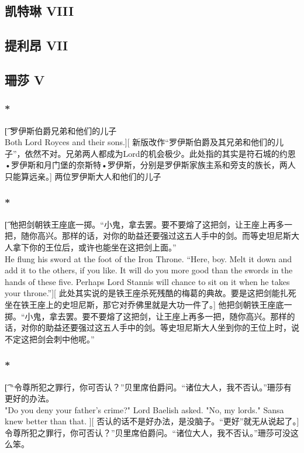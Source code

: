 \documentclass[12pt,a4paper]{article}
\begin{document}
	
\subsection{凯特琳 VIII}

\subsection{提利昂 VII}

\subsection{珊莎 V}
\subsubsection{\color{red}*}\t[	
	罗伊斯伯爵兄弟和他们的儿子\\
	Both Lord Royces and their sons.][
	新版改作“罗伊斯伯爵及其兄弟和他们的儿子”，依然不对。兄弟两人都成为Lord的机会极少。此处指的其实是符石城的约恩•罗伊斯和月门堡的奈斯特•罗伊斯，分别是罗伊斯家族主系和旁支的族长，两人只能算远亲。]
	两位罗伊斯大人和他们的儿子
	
\subsubsection{\color{red}*}\t[	
	他把剑朝铁王座底一掷。“小鬼，拿去罢。要不要熔了这把剑，让王座上再多一把，随你高兴。那样的话，对你的助益还要强过这五人手中的剑。而等史坦尼斯大人拿下你的王位后，或许也能坐在这把剑上面。”\\
	He flung his sword at the foot of the Iron Throne. “Here, boy. Melt it down and add it to the others, if you like. It will do you more good than the swords in the hands of these five. Perhaps Lord Stannis will chance to sit on it when he takes your throne.”][
	此处其实说的是铁王座杀死残酷的梅葛的典故。要是这把剑能扎死坐在铁王座上的史坦尼斯，那它对乔佛里就是大功一件了。]
	他把剑朝铁王座底一掷。“小鬼，拿去罢。要不要熔了这把剑，让王座上再多一把，随你高兴。那样的话，对你的助益还要强过这五人手中的剑。等史坦尼斯大人坐到你的王位上时，说不定这把剑会刺中他呢。”
	
\subsubsection{\color{red}*}\t[	
	“令尊所犯之罪行，你可否认？”贝里席伯爵问。“诸位大人，我不否认。”珊莎有更好的办法。\\
	"Do you deny your father's crime?" Lord Baelish asked. "No, my lords." Sansa knew better than that. ][
	否认的话不是好办法，是没脑子。“更好”就无从说起了。]
	令尊所犯之罪行，你可否认？”贝里席伯爵问。“诸位大人，我不否认。”珊莎可没这么笨。
	
\end{document}
